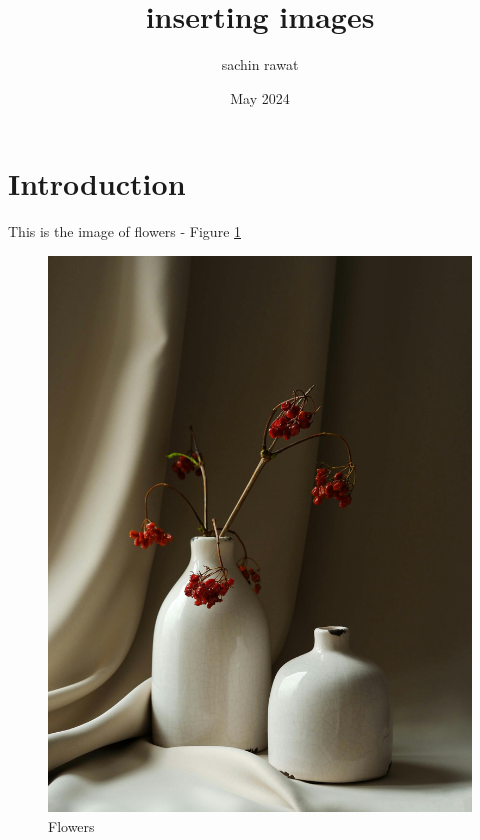 \documentclass{article}
\title{inserting images}
\author{sachin rawat}
\date{May 2024}
\begin{document}
\maketitle

\section{Introduction} 
This is the image of flowers - Figure \ref{fig:flower}
\begin{figure}[htb]
    \centering
    \includegraphics[width=0.75\linewidth]{mary-skrynnikova-7T12an8w_hQ-unsplash.jpg}
    \caption{Flowers}
    \label{fig:flower}
\end{figure}
\end{document}
